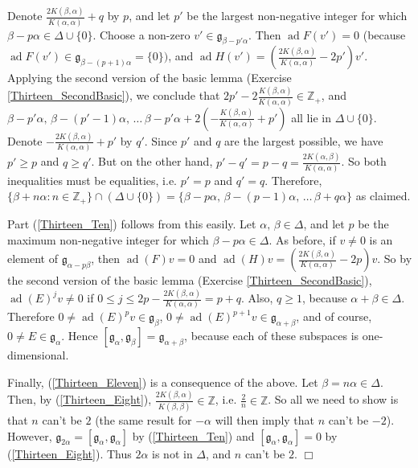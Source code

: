 \documentclass{article}
\newcommand{\ad}{\operatorname{ad}}
\begin{document}
Denote $\frac{2 K(\beta, \alpha)}{K (\alpha, \alpha)} +q$ by $p$, and let $p'$ be the largest non-negative integer for which $\beta - p\alpha \in \Delta \cup \{ 0 \} $. Choose a non-zero $v' \in {\mathfrak g}_{\beta - p'\alpha}$. Then $\ad F (v')=0$ (because $\ad F (v') \in {\mathfrak g}_{\beta - (p+1)\alpha} = \{ 0 \})$, and $\ad H (v')= \left( \frac{2 K(\beta, \alpha)}{K (\alpha, \alpha)} -2p' \right) v'$. Applying the second version of the basic lemma (Exercise \ref{Thirteen_SecondBasic}), we conclude that $2p' - 2\frac{K(\beta, \alpha)}{K(\alpha, \alpha)} \in \mathbb{Z}_+$, and $\beta - p'\alpha,\, \beta - (p'-1)\alpha,\, \ldots \, \beta - p'\alpha + 2 \left( - \frac{K(\beta, \alpha)}{K(\alpha, \alpha)} + p' \right)$ all lie in $\Delta \cup \{ 0 \}$. Denote $- \frac{2K(\beta, \alpha)}{K(\alpha, \alpha)} + p'$ by $q'$. Since $p'$ and $q$ are the largest possible, we have $p' \geq p$ and $q \geq q'$. But on the other hand, $p' - q' = p -q = \frac{2 K(\alpha, \beta)}{K(\alpha, \alpha)}$. So both inequalities must be equalities, i.e. $p'=p$ and $q'=q$. Therefore, $\{ \beta + n\alpha : n \in \mathbb{Z}_+ \} \cap (\Delta \cup \{ 0 \}) = \{ \beta - p\alpha,\, \beta - (p-1)\alpha ,\, \ldots\, \beta + q\alpha \}$ as claimed.

Part (\ref{Thirteen_Ten}) follows from this easily. Let $\alpha ,\, \beta \in \Delta$, and let $p$ be the maximum non-negative integer for which $\beta - p\alpha \in \Delta$. As before, if $v \neq 0$ is an element of ${\mathfrak g}_{\alpha - p\beta}$, then $\ad (F)v=0$ and $\ad (H)v = \left( \frac{2K(\beta, \alpha)}{K(\alpha, \alpha)} -2p \right) v$. So by the second version of the basic lemma (Exercise \ref{Thirteen_SecondBasic}), $\ad (E)^j v \neq 0$ if $0 \leq j \leq 2p - \frac{2 K(\beta, \alpha)}{K(\alpha, \alpha)} = p+q$. Also, $q \geq 1$, because $\alpha + \beta \in \Delta$. Therefore $0 \neq \ad (E)^p v \in {\mathfrak g}_\beta$, $0 \neq \ad (E)^{p+1}v \in {\mathfrak g}_{\alpha + \beta}$, and of course, $0 \neq E \in {\mathfrak g}_\alpha$. Hence $[{\mathfrak g}_\alpha, {\mathfrak g}_\beta] = {\mathfrak g}_{\alpha + \beta}$, because each of these subspaces is one-dimensional.

Finally, (\ref{Thirteen_Eleven}) is a consequence of the above. Let $\beta = n \alpha \in \Delta$. Then, by (\ref{Thirteen_Eight}), $\frac{2K (\beta, \alpha)}{K(\beta, \beta)} \in \mathbb{Z}$, i.e. $\frac{2}{n} \in \mathbb{Z}$. So all we need to show is that $n$ can't be $2$ (the same result for $-\alpha$ will then imply that $n$ can't be $-2$). However, ${\mathfrak g}_{2\alpha}=[{\mathfrak g}_\alpha, {\mathfrak g}_\alpha]$ by (\ref{Thirteen_Ten}) and $[{\mathfrak g}_\alpha, {\mathfrak g}_\alpha] =0$ by (\ref{Thirteen_Eight}). Thus $2 \alpha$ is not in $\Delta$, and $n$ can't be $2$. \hfill $\Box$
\end{document}
